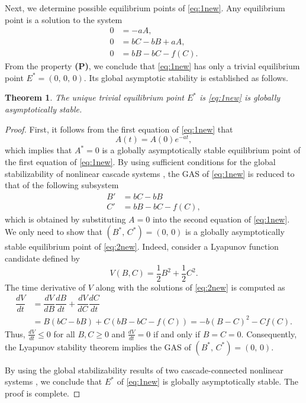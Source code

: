 \documentclass[12pt]{article}
\newtheorem{theorem}{Theorem}[section]
\theoremstyle{definition}
\theoremstyle{remark}
\numberwithin{equation}{section}
\begin{document}
Next, we determine possible equilibrium points of \eqref{eq:1new}. Any equilibrium point is a solution to the system
\begin{equation}\label{eq:EQ1}
\begin{split}
0&= -a A,\\
0&= b C - b B + aA,\\
0&= b B- b C- f(C).
\end{split}
\end{equation}
From the property \textbf{(P)}, we conclude that \eqref{eq:1new} has only a trivial equilibrium point $E^* = (0,\,0,\,0)$. Its global asymptotic stability is established as follows.
\begin{theorem}\label{Theorem1}
The unique trivial equilibrium point $E^*$ is \eqref{eq:1new} is globally asymptotically stable.
\end{theorem}
\begin{proof}
First, it follows from the first equation of \eqref{eq:1new} that
\begin{equation*}
A(t) = A(0)e^{-at},
\end{equation*}
which implies that $A^* = 0$ is a globally asymptotically stable equilibrium point of the first equation of \eqref{eq:1new}. By using sufficient conditions for the global stabilizability of nonlinear cascade systems \cite{Seibert}, the GAS of \eqref{eq:1new} is reduced to that of the following subsystem
\begin{equation}\label{eq:2new}
\begin{split}
B' &= b C - b B\\
C'&= b B - bC - f(C),
\end{split}
\end{equation}
which is obtained by substituting $A = 0$ into the second equation of \eqref{eq:1new}. We only need to show that $(B^*,\,C^*) = (0,\,0)$ is a globally asymptotically stable equilibrium point of \eqref{eq:2new}. Indeed, consider a Lyapunov function candidate defined by
\begin{equation}\label{eq:6}
V(B, C) = \dfrac{1}{2}B^2 + \dfrac{1}{2}C^2.
\end{equation}
The time derivative of $V$ along with the solutions of \eqref{eq:2new} is computed as
\begin{equation*}
\begin{split}
\dfrac{dV}{dt} &= \dfrac{dV}{dB}\dfrac{dB}{dt} + \dfrac{dV}{dC}\dfrac{dC}{dt}\\
&=B(bC - bB) + C(b B - bC - f(C)) = - b(B - C)^2 - Cf(C).
\end{split}
\end{equation*}
Thus, $\frac{dV}{dt} \leq 0$ for all $B, C \geq 0$ and $\frac{dV}{dt} = 0$ if and only if $B = C = 0$. Consequently, the Lyapunov stability theorem \cite{Khalil} implies the GAS of $(B^*,\,C^*) = (0,\,0)$.


By using the global stabilizability results of two cascade-connected nonlinear systems \cite[Corollary 4.3]{Seibert}, we conclude that $E^*$ of \eqref{eq:1new} is globally asymptotically stable. The proof is complete.
\end{proof}
\end{document}
